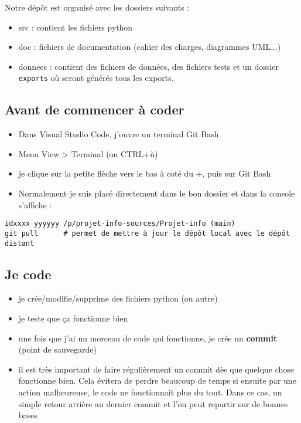 \documentclass[11pt]{article}
\begin{document}
\bigbreak

Notre dépôt est organisé avec les dossiers suivants :
\begin{itemize}
    \item src : contient les fichiers python
    \item doc : fichiers de documentation (cahier des charges, diagrammes UML...)
    \item donnees : contient des fichiers de données, des fichiers tests et un dossier \texttt{exports} où seront générés tous les exports. 
\end{itemize}


\subsection*{Avant de commencer à coder}

\begin{itemize}
    \item Dans Visual Studio Code, j'ouvre un terminal Git Bash
    \item Menu View > Terminal (ou CTRL+ù)
    \item je clique sur la petite flèche vers le bas à coté du +, puis sur Git Bash
    \item Normalement je suis placé directement dans le bon dossier et dans la console s'affiche : 
\end{itemize}


\noindent
\verb"idxxxx yyyyyy /p/projet-info-sources/Projet-info (main)" \\
\verb"git pull      # permet de mettre à jour le dépôt local avec le dépôt distant"




\subsection*{Je code}

\begin{itemize}
    \item je crée/modifie/supprime des fichiers python (ou autre)
    \item je teste que ça fonctionne bien
    \item une fois que j'ai un morceau de code qui fonctionne, je crée un \textbf{commit} (point de sauvegarde)
    \item il est très important de faire régulièrement un commit dès que quelque chose fonctionne bien. Cela évitera de perdre beaucoup de temps si ensuite par une action malheureuse, le code ne fonctionnait plus du tout. Dans ce cas, un simple retour arrière au dernier commit et l'on peut repartir sur de bonnes bases
\end{itemize}
\end{document}
